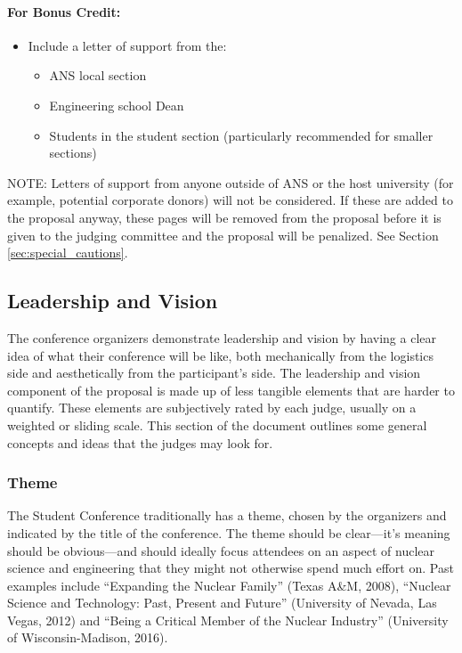 \documentclass[12pt]{article}
\begin{document}
\paragraph{For Bonus Credit:}
\begin{itemize}
\item{Include a letter of support from the:
\begin{itemize}
\item{ANS local section}
\item{Engineering school Dean}
\item{Students in the student section (particularly recommended for smaller sections)}
\end{itemize}
}
\end{itemize}

NOTE: Letters of support from anyone outside of ANS or the host university (for example,
potential corporate donors) will not be considered. If these are added to the
proposal anyway, these pages will be removed from the proposal before it is given to
the judging committee and the proposal will be penalized. See Section \ref{sec:special_cautions}.

\subsection{Leadership and Vision} \label{sec:LandV2}
The conference organizers demonstrate leadership and vision by having a clear idea of
what their conference will be like, both mechanically from the logistics side and
aesthetically from the participant’s side. The leadership and vision component of the
proposal is made up of less tangible elements that are harder to quantify. These elements
are subjectively rated by each judge, usually on a weighted or sliding scale. This section
of the document outlines some general concepts and ideas that the judges may look for.


\subsubsection{Theme}
The Student Conference traditionally has a theme, chosen by the organizers and indicated
by the title of the conference. The theme should be clear---it's meaning should be obvious---and should ideally focus attendees on an aspect of nuclear science and
engineering that they might not otherwise spend much effort on. Past examples include
“Expanding the Nuclear Family” (Texas A\&M, 2008), “Nuclear Science and Technology: Past, Present and Future” (University of Nevada, Las Vegas, 2012) and “Being a Critical Member of the Nuclear Industry” (University of Wisconsin-Madison, 2016).
\end{document}
